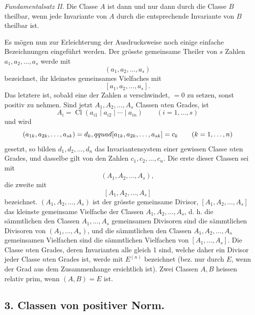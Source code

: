 \documentclass[11pt,a4paper]{article}
\newcommand{\Cl}{\operatorname{Cl}}
\begin{document}
\emph{Fundamentalsatz II.} Die Classe $A$ ist dann und nur dann durch die Classe $B$ theilbar, wenn jede Invariante von $A$ durch die entsprechende Invariante von $B$ theilbar ist.

Es mögen nun zur Erleichterung der Ausdrucksweise noch einige einfache Bezeichnungen eingeführt werden. Der grösste gemeinsame Theiler von $s$ Zahlen $a_1,a_2,\ldots,a_s$ werde mit
\[
 (a_1,a_2,\ldots,a_s)
\]
bezeichnet, ihr kleinstes gemeinsames Vielfaches mit
\[
 [a_1,a_2,\ldots,a_s].
\]
Das letztere ist, sobald eine der Zahlen $a$ verschwindet, $=0$ zu setzen, sonst positiv zu nehmen. Sind jetzt $A_1,A_2,\ldots,A_s$ Classen $n$ten Grades, ist
\[
 A_i=\Cl(a_{i1}\mid a_{i2}\mid\cdots\mid a_{in})\qquad (i=1,\ldots,s)
\]
und wird
\[
 (a_{1k},a_{2k},\ldots,a_{sk})=d_k,\\qquad [a_{1k},a_{2k},\ldots,a_{sk}]=c_k \qquad (k=1,\ldots,n)
\]
gesetzt, so bilden $d_1,d_2,\ldots,d_n$ das Invariantensystem einer gewissen Classe $n$ten Grades, und dasselbe gilt von den Zahlen $c_1,c_2,\ldots,c_n$. Die erste dieser Classen sei mit
\[
 (A_1,A_2,\ldots,A_s),
\]
die zweite mit
\[
 [A_1,A_2,\ldots,A_s]
\]
bezeichnet. $(A_1,A_2,\ldots,A_s)$ ist der grösste gemeinsame Divisor, $[A_1,A_2,\ldots,A_s]$ das kleinste gemeinsame Vielfache der Classen $A_1,A_2,\ldots,A_s$, d. h. die sämmtlichen den Classen $A_1,\ldots,A_s$ gemeinsamen Divisoren sind die sämmtlichen Divisoren von $(A_1,\ldots,A_s)$, und die sämmtlichen den Classen $A_1,A_2,\ldots,A_s$ gemeinsamen Vielfachen sind die sämmtlichen Vielfachen von $[A_1,\ldots,A_s]$. Die Classe $n$ten Grades, deren Invarianten alle gleich 1 sind, welche daher ein Divisor jeder Classe $n$ten Grades ist, werde mit $E^{(n)}$ bezeichnet (bez. nur durch $E$, wenn der Grad aus dem Zusammenhange ersichtlich ist). Zwei Classen $A,B$ heissen relativ prim, wenn $(A,B)=E$ ist.

\subsection*{3. Classen von positiver Norm.}
\end{document}
